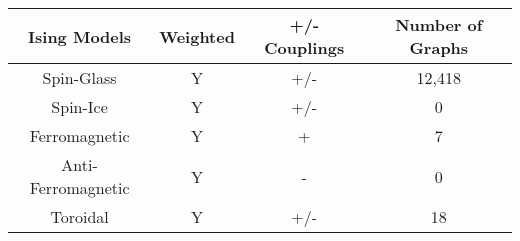 \documentclass{standalone}
\begin{document}
\begin{tabular}{ |c|c|c|c| } 
    \hline
    Ising Models & Weighted & +/- Couplings & Number of Graphs\\ 
    \hline
    Spin-Glass & Y & +/- & 12,418 \\ 
    Spin-Ice & Y & +/- & 0 \\ 
    Ferromagnetic & Y & + & 7  \\ 
    Anti-Ferromagnetic & Y & - & 0  \\
    Toroidal & Y & +/- & 18  \\ 
    \hline
\end{tabular}
\end{document}
